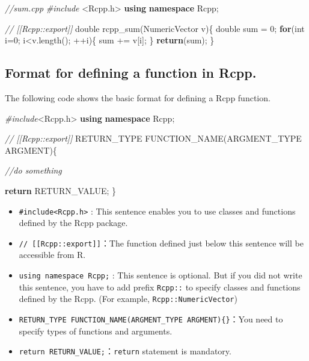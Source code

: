 \documentclass[]{book}
\newenvironment{Shaded}{\begin{snugshade}}{\end{snugshade}}
\newcommand{\KeywordTok}[1]{\textcolor[rgb]{0.13,0.29,0.53}{\textbf{#1}}}
\newcommand{\DataTypeTok}[1]{\textcolor[rgb]{0.13,0.29,0.53}{#1}}
\newcommand{\DecValTok}[1]{\textcolor[rgb]{0.00,0.00,0.81}{#1}}
\newcommand{\ImportTok}[1]{#1}
\newcommand{\CommentTok}[1]{\textcolor[rgb]{0.56,0.35,0.01}{\textit{#1}}}
\newcommand{\ControlFlowTok}[1]{\textcolor[rgb]{0.13,0.29,0.53}{\textbf{#1}}}
\newcommand{\PreprocessorTok}[1]{\textcolor[rgb]{0.56,0.35,0.01}{\textit{#1}}}
\newcommand{\NormalTok}[1]{#1}
\theoremstyle{definition}
\theoremstyle{definition}
\theoremstyle{remark}
\begin{document}
\begin{Shaded}
\begin{Highlighting}[]
\CommentTok{//sum.cpp}
\PreprocessorTok{#include }\ImportTok{<Rcpp.h>}
\KeywordTok{using} \KeywordTok{namespace}\NormalTok{ Rcpp;}

\CommentTok{// [[Rcpp::export]]}
\DataTypeTok{double}\NormalTok{ rcpp_sum(NumericVector v)\{}
    \DataTypeTok{double}\NormalTok{ sum = }\DecValTok{0}\NormalTok{;}
    \ControlFlowTok{for}\NormalTok{(}\DataTypeTok{int}\NormalTok{ i=}\DecValTok{0}\NormalTok{; i<v.length(); ++i)\{}
\NormalTok{        sum += v[i];}
\NormalTok{    \}}
    \ControlFlowTok{return}\NormalTok{(sum);}
\NormalTok{\}}
\end{Highlighting}
\end{Shaded}

\subsection{Format for defining a function in
Rcpp.}\label{format-for-defining-a-function-in-rcpp.}

The following code shows the basic format for defining a Rcpp function.

\begin{Shaded}
\begin{Highlighting}[]
\PreprocessorTok{#include}\ImportTok{<Rcpp.h>}
\KeywordTok{using} \KeywordTok{namespace}\NormalTok{ Rcpp;}

\CommentTok{// [[Rcpp::export]]}
\NormalTok{RETURN_TYPE FUNCTION_NAME(ARGMENT_TYPE ARGMENT)\{}

    \CommentTok{//do something}

    \ControlFlowTok{return}\NormalTok{ RETURN_VALUE;}
\NormalTok{\}}
\end{Highlighting}
\end{Shaded}

\begin{itemize}
\item
  \texttt{\#include\textless{}Rcpp.h\textgreater{}} : This sentence
  enables you to use classes and functions defined by the Rcpp package.
\item
  \texttt{//\ {[}{[}Rcpp::export{]}{]}}：The function defined just below
  this sentence will be accessible from R.
\item
  \texttt{using\ namespace\ Rcpp;} : This sentence is optional. But if
  you did not write this sentence, you have to add prefix
  \texttt{Rcpp::} to specify classes and functions defined by the Rcpp.
  (For example, \texttt{Rcpp::NumericVector})
\item
  \texttt{RETURN\_TYPE\ FUNCTION\_NAME(ARGMENT\_TYPE\ ARGMENT)\{\}}：You
  need to specify types of functions and arguments.
\item
  \texttt{return\ RETURN\_VALUE;}：\texttt{return} statement is
  mandatory.
\end{itemize}
\end{document}
